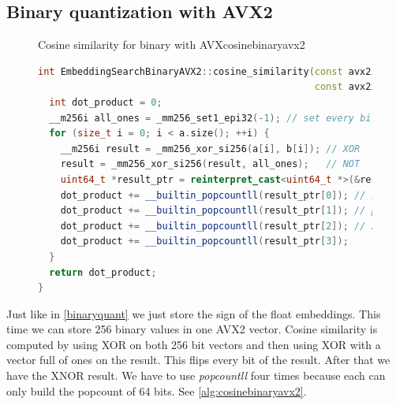 \subsection{Binary quantization with AVX2}
\label{binaryquantavx2}
\begin{figure}[h]
    \begin{algorithm}{Cosine similarity for binary with AVX}{cosinebinaryavx2}
        \begin{lstlisting}[language=C++]
int EmbeddingSearchBinaryAVX2::cosine_similarity(const avx2i_vector &a,
                                                 const avx2i_vector &b) {
  int dot_product = 0;
  __m256i all_ones = _mm256_set1_epi32(-1); // set every bit to 1
  for (size_t i = 0; i < a.size(); ++i) {
    __m256i result = _mm256_xor_si256(a[i], b[i]); // XOR
    result = _mm256_xor_si256(result, all_ones);   // NOT
    uint64_t *result_ptr = reinterpret_cast<uint64_t *>(&result);
    dot_product += __builtin_popcountll(result_ptr[0]); // sum all 64 bit
    dot_product += __builtin_popcountll(result_ptr[1]); // popcounts for
    dot_product += __builtin_popcountll(result_ptr[2]); // 256 bit result
    dot_product += __builtin_popcountll(result_ptr[3]);
  }
  return dot_product;
}
    \end{lstlisting}
    \end{algorithm}
\end{figure}
Just like in \autoref{binaryquant} we just store the sign of the float embeddings. This time we can store 256 binary values in one AVX2 vector. Cosine similarity is computed by using XOR on both 256 bit vectors and then using XOR with a vector full of ones on the result. This flips every bit of the result. After that we have the XNOR result. We have to use \textit{popcountll} four times because each can only build the popcount of 64 bits. See \autoref{alg:cosinebinaryavx2}.

